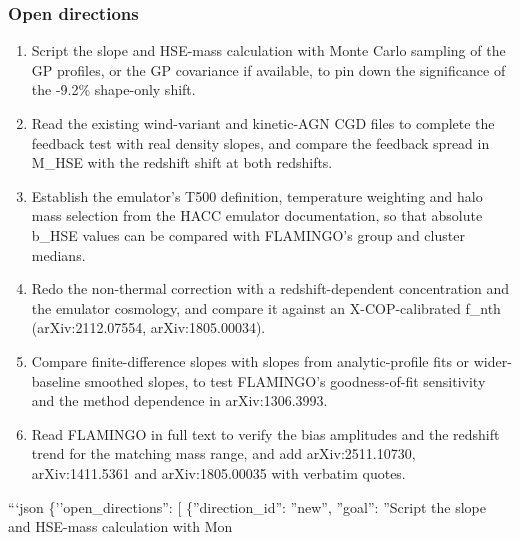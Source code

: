 \documentclass[11pt,a4paper]{article}
\begin{document}
\subsubsection*{Open directions}
\begin{enumerate}
  \item Script the slope and HSE-mass calculation with Monte Carlo sampling of the GP profiles, or the GP covariance if available, to pin down the significance of the -9.2\% shape-only shift.
  \item Read the existing wind-variant and kinetic-AGN CGD files to complete the feedback test with real density slopes, and compare the feedback spread in M\_HSE with the redshift shift at both redshifts.
  \item Establish the emulator's T500 definition, temperature weighting and halo mass selection from the HACC emulator documentation, so that absolute b\_HSE values can be compared with FLAMINGO's group and cluster medians.
  \item Redo the non-thermal correction with a redshift-dependent concentration and the emulator cosmology, and compare it against an X-COP-calibrated f\_nth (arXiv:2112.07554, arXiv:1805.00034).
  \item Compare finite-difference slopes with slopes from analytic-profile fits or wider-baseline smoothed slopes, to test FLAMINGO's goodness-of-fit sensitivity and the method dependence in arXiv:1306.3993.
  \item Read FLAMINGO in full text to verify the bias amplitudes and the redshift trend for the matching mass range, and add arXiv:2511.10730, arXiv:1411.5361 and arXiv:1805.00035 with verbatim quotes.
\end{enumerate}
```json \{''open\_directions'': [ \{''direction\_id'': ''new'', ''goal'': ''Script the slope and HSE-mass calculation with Mon
\end{document}
